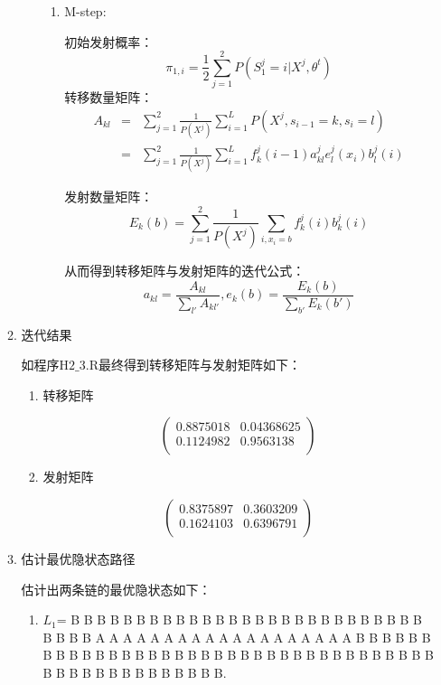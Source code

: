 \documentclass{ctexart}
\begin{document}
\begin{enumerate}
\begin{enumerate}
\begin{enumerate}
\begin{enumerate}
\item M-step:

初始发射概率：
\[\pi_{1,i} = \frac{1}{2}\sum_{j=1}^2P(S_1^j=i|X^j,\theta^t)\]
转移数量矩阵：
\begin{eqnarray*}
A_{kl}&=&\sum_{j=1}^2\frac{1}{P(X^j)}\sum_{i=1}^LP(X^j,s_{i-1}=k,s_i=l)\\
&=&\sum_{j=1}^2\frac{1}{P(X^j)}\sum_{i=1}^L f_k^j(i-1)a_{kl}^je_l^j(x_i)b_l^j(i)
\end{eqnarray*}

发射数量矩阵：
\[E_k(b)=\sum_{j=1}^2\frac{1}{P(X^j)}\sum_{i,x_i=b}f_k^j(i)b_k^j(i)\]

从而得到转移矩阵与发射矩阵的迭代公式：
 \[a_{kl}=\frac{A_{kl}}{\sum_{l'}A_{kl'}},e_k(b)=\frac{E_k(b)}{\sum_{b'}E_k(b')}\]
 \end{enumerate}
 \end{enumerate}
 
 \item 迭代结果
 
如程序\(\mbox{H}2\_3.\mbox{R}\)最终得到转移矩阵与发射矩阵如下：
 
 
 
\begin{enumerate}
\item 转移矩阵
 
 \begin{equation*}
\left(
\begin{array}{ccc}
    0.8875018 &  0.04368625  \\
   0.1124982& 0.9563138 \\
   \end{array}
   \right)
  \end{equation*}


\item 发射矩阵

 \begin{equation*}
\left(
\begin{array}{ccc}
    0.8375897 & 0.3603209  \\
   0.1624103 & 0.6396791 \\
   \end{array}
   \right)
  \end{equation*}


\end{enumerate}
 
 
 
 
 \item 估计最优隐状态路径
 
估计出两条链的最优隐状态如下：
 \begin{enumerate}
\item \(L_1\)= B B B B B B B B B B B B B B B B B B B B B B B B B B B B B B B A A A A A A A A A A A A A A A A A A A B B B B B B B B B B B B B B B B B B B B B B B B B B B B B B B B B B B B B B B B B B B B B B B B B B.


\end{enumerate}
\end{enumerate}
\end{enumerate}
\end{document}
